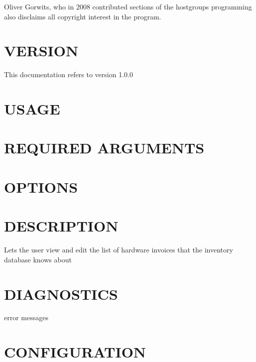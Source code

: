 \documentclass{book}
\begin{document}
Oliver Gorwits, who in 2008 contributed sections of the hostgroups programming also disclaims all copyright interest in the program.




\section{VERSION}
\label{_VERSION}
\hypertarget{_VERSION}{}



This documentation refers to version 1.0.0


\section{USAGE}
\label{_USAGE}
\hypertarget{_USAGE}{}


\section{REQUIRED ARGUMENTS}
\label{_REQUIRED_ARGUMENTS}
\hypertarget{_REQUIRED_ARGUMENTS}{}


\section{OPTIONS}
\label{_OPTIONS}
\hypertarget{_OPTIONS}{}


\section{DESCRIPTION}
\label{_DESCRIPTION}
\hypertarget{_DESCRIPTION}{}



Lets the user view and edit the list of hardware invoices that the inventory database knows about


\section{DIAGNOSTICS}
\label{_DIAGNOSTICS}
\hypertarget{_DIAGNOSTICS}{}



error messages


\section{CONFIGURATION}
\label{_CONFIGURATION}
\hypertarget{_CONFIGURATION}{}
\end{document}
